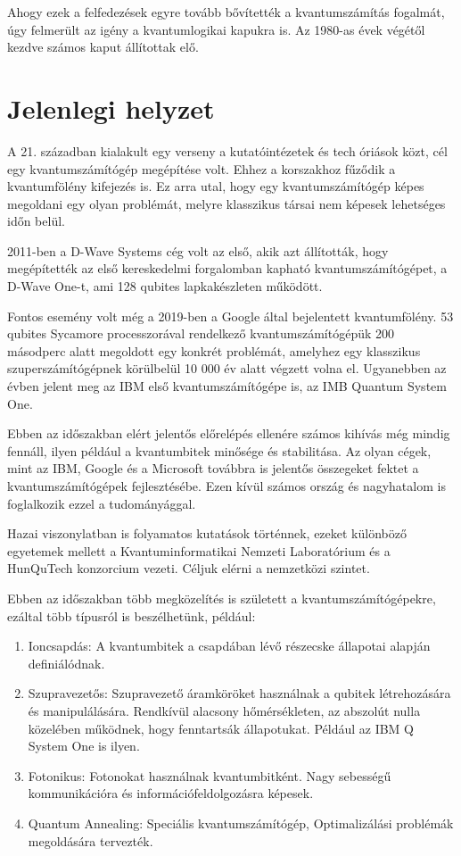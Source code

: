 \documentclass[
]{thesis-ekf}
\theoremstyle{definition}
\theoremstyle{remark}
\begin{document}
Ahogy ezek a felfedezések egyre tovább bővítették a kvantumszámítás fogalmát, úgy felmerült az igény a kvantumlogikai kapukra is. Az 1980-as évek végétől kezdve számos kaput állítottak elő.
\section{Jelenlegi helyzet}
A 21. században kialakult egy verseny a kutatóintézetek és tech óriások közt, cél egy kvantumszámítógép megépítése volt. Ehhez a korszakhoz fűződik a kvantumfölény kifejezés is. Ez arra utal, hogy egy kvantumszámítógép képes megoldani egy olyan problémát, melyre klasszikus társai nem képesek lehetséges időn belül.

2011-ben a D-Wave Systems cég volt az első, akik azt állították, hogy megépítették az első kereskedelmi forgalomban kapható kvantumszámítógépet, a D-Wave One-t, ami 128 qubites lapkakészleten működött.

Fontos esemény volt még a 2019-ben a Google által bejelentett kvantumfölény. 53 qubites Sycamore processzorával rendelkező kvantumszámítógépük 200 másodperc alatt megoldott egy konkrét problémát, amelyhez egy klasszikus szuperszámítógépnek körülbelül 10 000 év alatt végzett volna el. Ugyanebben az évben jelent meg az IBM első kvantumszámítógépe is, az IMB Quantum System One.

Ebben az időszakban elért jelentős előrelépés ellenére számos kihívás még mindig fennáll, ilyen például a kvantumbitek minősége és stabilitása. Az olyan cégek, mint az IBM, Google és a Microsoft továbbra is jelentős összegeket fektet a kvantumszámítógépek fejlesztésébe. Ezen kívül számos ország és nagyhatalom is foglalkozik ezzel a tudományággal.

Hazai viszonylatban is folyamatos kutatások történnek, ezeket különböző egyetemek mellett a Kvantuminformatikai Nemzeti Laboratórium és a HunQuTech konzorcium vezeti. Céljuk elérni a nemzetközi szintet.

Ebben az időszakban több megközelítés is született a kvantumszámítógépekre, ezáltal több típusról is beszélhetünk, például:

\begin{enumerate}
	\item Ioncsapdás: A kvantumbitek a csapdában lévő részecske állapotai alapján definiálódnak. 
	\item Szupravezetős: Szupravezető áramköröket használnak a qubitek létrehozására és manipulálására. Rendkívül alacsony hőmérsékleten, az abszolút nulla közelében működnek, hogy fenntartsák állapotukat. Például az IBM Q System One is ilyen.
	\item Fotonikus: Fotonokat használnak kvantumbitként. Nagy sebességű kommunikációra és információfeldolgozásra képesek.
	\item Quantum Annealing: Speciális kvantumszámítógép, Optimalizálási problémák megoldására tervezték.
\end{enumerate}
\end{document}
